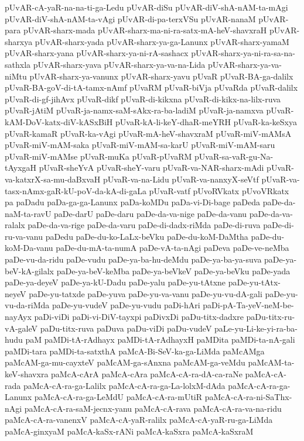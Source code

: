{pUvAR-cA-yaR-na-na-ti-ga-Ledu
pUvAR-diSu
pUvAR-diV-shA-nAM-ta-mAgi
pUvAR-diV-shA-nAM-ta-vAgi
pUvAR-di-pa-terxVSu
pUvAR-nanaM
pUvAR-para
pUvAR-sharx-mada
pUvAR-sharx-ma-ni-ra-satx-mA-heV-shavxraH
pUvAR-sharxya
pUvAR-sharx-yada
pUvAR-sharx-ya-ga-Lanunx
pUvAR-sharx-yamaM
pUvAR-sharx-yana
pUvAR-sharx-ya-ni-rA-sashacx
pUvAR-sharx-ya-ni-ra-sa-na-sathxla
pUvAR-sharx-yava
pUvAR-sharx-ya-va-na-Lida
pUvAR-sharx-ya-va-niMtu
pUvAR-sharx-ya-vanunx
pUvAR-sharx-yavu
pUvaR
pUvaR-BA-ga-dalilx
pUvaR-BA-goV-di-tA-tamx-nAmf
pUvaRM
pUvaR-biVja
pUvaRda
pUvaR-dalilx
pUvaR-di-gf-jihAvx
pUvaR-dikf
pUvaR-di-kikxna
pUvaR-di-kikx-na-lilx-ruva
pUvaR-jAtiM
pUvaR-ja-namx-saM-sAkx-ra-ba-ladiM
pUvaR-ja-namxva
pUvaR-kAM-DoV-katx-diV-kASxBiH
pUvaR-kA-li-keY-dhaR-meYRH
pUvaR-ka-keSxya
pUvaR-kamaR
pUvaR-ka-vAgi
pUvaR-mA-heV-shavxraM
pUvaR-miV-mAMsA
pUvaR-miV-mAM-saka
pUvaR-miV-mAM-sa-karU
pUvaR-miV-mAM-saru
pUvaR-miV-mAMse
pUvaR-muKa
pUvaR-pUvaRM
pUvaR-sa-vaR-gu-Na-tAyxgaH
pUvaR-sheYvA
pUvaR-sheY-varu
pUvaR-va-NAR-sharx-mAdi
pUvaR-va-katxrX-sa-mu-daBxvaH
pUvaR-va-na-Lidu
pUvaR-va-nanxyX-seVtf
pUvaR-va-tasx-nAmx-gaR-kU-poV-da-kA-di-gaLa
pUvaR-vatf
pUvoRVkatx
pUvoVRkatx
pa
paDadu
paDa-ga-ga-Lanunx
paDa-koMDu
paDa-vi-Di-bage
paDeda
paDe-da-naM-ta-ravU
paDe-darU
paDe-daru
paDe-da-va-nige
paDe-da-vanu
paDe-da-va-ralalx
paDe-da-va-rige
paDe-da-varu
paDe-di-dadx-riMda
paDe-di-ruva
paDe-di-ru-va-vanu
paDedu
paDe-du-ko-LaLx-beVku
paDe-du-koM-DaMtha
paDe-du-koM-Da-vanu
paDe-du-mA-ta-numA
paDe-vA-ta-nAgi
paDeva
paDe-ve-neMba
paDe-vu-da-ridu
paDe-vudu
paDe-ya-ba-hu-deMdu
paDe-ya-ba-ya-suva
paDe-ya-beV-kA-gilalx
paDe-ya-beV-keMba
paDe-ya-beVkeV
paDe-ya-beVku
paDe-yada
paDe-ya-deyeV
paDe-ya-kU-Dadu
paDe-yalu
paDe-yu-tAtxne
paDe-yu-tAtx-neyeV
paDe-yu-tatxde
paDe-yuva
paDe-yu-va-vanu
paDe-yu-vu-dA-gali
paDe-yu-vu-da-riMda
paDe-yu-vudeV
paDe-yu-vudu
paDi-hAri
paDi-pA-Ta-yeV-neM-be-nayAyx
paDi-viDi
paDi-vi-DiV-tayxpi
paDivxDi
paDu-titx-dadxre
paDu-titx-ru-vA-galeV
paDu-titx-ruva
paDuva
paDu-viDi
paDu-vudeV
paLe-yu-Li-ke-yi-ra-ba-hudu
paM
paMDi-tA-rAdhayx
paMDi-tA-rAdhayxH
paMDita
paMDi-ta-nA-gali
paMDi-tara
paMDi-ta-satxthA
paMcA-Bi-SeV-ka-ga-LiMda
paMcAMga
paMcAM-ga-mu-cayxteV
paMcAM-ga-sAnxna
paMcAM-ga-veMdu
paMcAM-ta-keV-shavxra
paMcA-cArA
paMcA-cAra
paMcA-cA-ra-dA-ca-raNe
paMcA-cA-rada
paMcA-cA-ra-ga-Lalilx
paMcA-cA-ra-ga-La-lolxM-dAda
paMcA-cA-ra-ga-Lanunx
paMcA-cA-ra-ga-LeMdU
paMcA-cA-ra-mUtiR
paMcA-cA-ra-ni-SaThx-nAgi
paMcA-cA-ra-saM-jecnx-yanu
paMcA-cA-rava
paMcA-cA-ra-va-na-ridu
paMcA-cA-ra-vanenxV
paMcA-cA-yaR-ralilx
paMcA-cA-yaR-ru-ga-LiMda
paMcA-ginxyaM
paMcA-kaSx-rANi
paMcA-kaSxra
paMcA-kaSxraM
}
